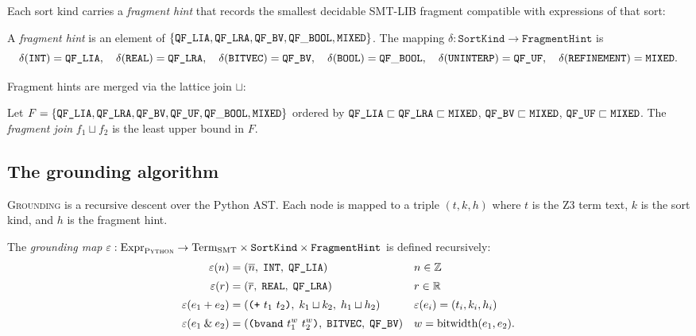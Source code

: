 \documentclass[11pt]{article}
\newcommand{\Enc}{\varepsilon}               %
\newcommand{\GroundAlg}{\textsc{Grounding}}  %
\begin{document}
Each sort kind carries a \emph{fragment hint} that records the
smallest decidable SMT-LIB fragment compatible with expressions
of that sort:

\begin{definition}[FragmentHint]\label{def:fragment-hint}
A \emph{fragment hint} is an element of
$\{\texttt{QF\_LIA}, \texttt{QF\_LRA}, \texttt{QF\_BV}, \mathtt{QF\_BOOL}, \mathtt{MIXED}\}$.
The mapping $\delta : \mathtt{SortKind} \to \mathtt{FragmentHint}$ is
\[
  \delta(\mathtt{INT})  = \texttt{QF\_LIA},\quad
  \delta(\mathtt{REAL}) = \texttt{QF\_LRA},\quad
  \delta(\mathtt{BITVEC}) = \texttt{QF\_BV},\quad
  \delta(\mathtt{BOOL}) = \mathtt{QF\_BOOL},\quad
  \delta(\mathtt{UNINTERP}) = \texttt{QF\_UF},\quad
  \delta(\mathtt{REFINEMENT}) = \mathtt{MIXED}.
\]
\end{definition}

Fragment hints are merged via the lattice join $\sqcup$:

\begin{definition}\label{def:frag-join}
Let $F = \{\texttt{QF\_LIA}, \texttt{QF\_LRA}, \texttt{QF\_BV}, \texttt{QF\_UF}, \mathtt{QF\_BOOL},
\mathtt{MIXED}\}$ ordered by $\texttt{QF\_LIA} \sqsubset \texttt{QF\_LRA}
\sqsubset \mathtt{MIXED}$, $\texttt{QF\_BV} \sqsubset \mathtt{MIXED}$,
$\texttt{QF\_UF} \sqsubset \mathtt{MIXED}$.
The \emph{fragment join} $f_1 \sqcup f_2$ is the least
upper bound in $F$.
\end{definition}

\subsection{The grounding algorithm}

\GroundAlg{} is a recursive descent over the Python AST.
Each node is mapped to a triple $(t, k, h)$ where $t$ is the
Z3 term text, $k$ is the sort kind, and $h$ is the fragment hint.

\begin{definition}\label{def:grounding}
The \emph{grounding map}
$\Enc : \mathrm{Expr}_\Python \to
 \mathrm{Term}_{\mathrm{SMT}} \times \mathtt{SortKind}
 \times \mathtt{FragmentHint}$
is defined recursively:
\begin{align*}
  \Enc(n)
    &= (\overline{n},\; \mathtt{INT},\; \QFLIA)
    && n \in \mathbb{Z} \\[2pt]
  \Enc(r)
    &= (\overline{r},\; \mathtt{REAL},\; \QFLRA)
    && r \in \mathbb{R} \\[2pt]
  \Enc(e_1 \mathbin{\mathtt{+}} e_2)
    &= (\texttt{(+}\ t_1\ t_2\texttt{)},\; k_1 \sqcup k_2,\;
       h_1 \sqcup h_2)
    && \Enc(e_i) = (t_i, k_i, h_i) \\[2pt]
  \Enc(e_1 \mathbin{\mathtt{\&}} e_2)
    &= (\texttt{(bvand}\ t_1^w\ t_2^w\texttt{)},\;
       \mathtt{BITVEC},\; \QFBV)
    && w = \mathrm{bitwidth}(e_1, e_2).
\end{align*}
\end{definition}
\end{document}
